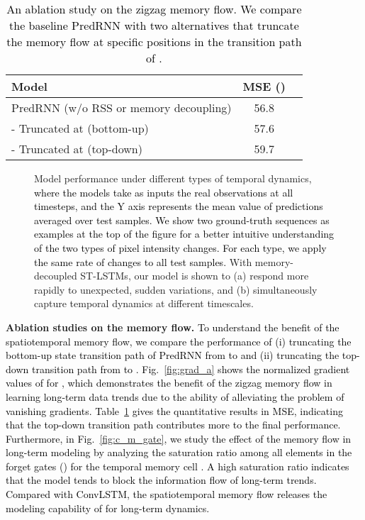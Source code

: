 \documentclass[10pt,journal,compsoc]{IEEEtran}
\newcommand{\tab}[1]{Table~\ref{#1}}
\newcommand{\fig}[1]{Fig.~\ref{#1}}
\newcommand{\revise}[1]{{\textcolor{black}{#1}}}
\newcommand{\myparagraph}[1]{\vspace{5pt} \noindent \textbf{#1.}}
\begin{document}
\begin{table}[t]
\vskip 0.05in
  \caption{\revise{An ablation study on the zigzag memory flow. We compare the baseline PredRNN with two alternatives that truncate the memory flow at specific positions in the transition path of .}}
  \vskip -0.05in
  \label{tab:ablation_flow}
  \centering
  \begin{tabular}{lcc}
    \toprule
    Model & MSE () \\
    \midrule
    PredRNN (w/o RSS or memory decoupling) & 56.8 \\
    - Truncated at  (bottom-up) & 57.6 \\
    - Truncated at  (top-down)
    & 59.7 \\
    \bottomrule
  \end{tabular}
  \vspace{-10pt}
\end{table}


\begin{figure*}[t]
  \centering
  \label{fig:short_term}
  \label{fig:long_term}
  \vskip -0.1in
\caption{Model performance under different types of temporal dynamics, 
\revise{where the models take as inputs the real observations at all timesteps, and the Y axis represents the mean value of predictions averaged over  test samples.
We show two ground-truth sequences as examples at the top of the figure for a better intuitive understanding of the two types of pixel intensity changes. For each type, we apply the same rate of changes to all test samples.} 
With memory-decoupled ST-LSTMs, our model is shown to (a) respond more rapidly to unexpected, sudden variations, and (b) simultaneously capture temporal dynamics at different timescales. 
}
\label{fig:long_short_term}
\vspace{-10pt}
\end{figure*}



\myparagraph{Ablation studies on the memory flow} 
\revise{
To understand the benefit of the spatiotemporal memory flow, we compare the performance of (i) truncating the bottom-up state transition path of PredRNN from  to  and (ii) truncating the top-down transition path from  to . 
\fig{fig:grad_a} shows the normalized gradient values of  for , which demonstrates the benefit of the zigzag memory flow in learning long-term data trends due to the ability of alleviating the problem of vanishing gradients.
\tab{tab:ablation_flow} gives the quantitative results in MSE, indicating that the top-down transition path contributes more to the final performance. 
Furthermore, in \fig{fig:c_m_gate}, we study the effect of the memory flow in long-term modeling by analyzing the saturation ratio among all elements in the forget gates () for the temporal memory cell .
A high saturation ratio indicates that the model tends to block the information flow of long-term trends.
Compared with ConvLSTM, the spatiotemporal memory flow releases the modeling capability of  for long-term dynamics.
}
\end{document}
